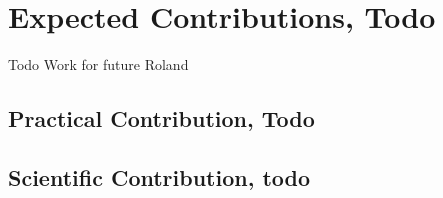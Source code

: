 
\section{Expected Contributions, Todo}

Todo
Work for future Roland
\subsection{Practical Contribution, Todo}
\subsection{Scientific Contribution, todo}
